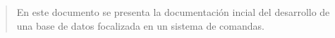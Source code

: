 \newpage
\begin{abstract}
    
   En este documento se presenta la documentación incial del desarrollo de una base de datos focalizada en un sistema de comandas.

\end{abstract}
\thispagestyle{empty}
\clearpage